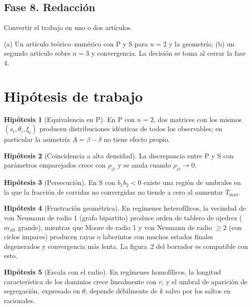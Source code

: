 \documentclass[11pt,a4paper]{article}
\theoremstyle{plain}
\theoremstyle{definition}
\newtheorem{hipotesis}{Hipótesis}
\theoremstyle{remark}
\newcommand{\vac}{\varnothing}
\newcommand{\modP}{\textsf{P}}
\newcommand{\modS}{\textsf{S}}
\newenvironment{fase}[1]{\subsection*{#1}\begin{description}[leftmargin=0pt,itemsep=2pt]}{\end{description}}
\begin{document}
\begin{fase}{Fase 8. Redacción}
\item[Objetivo.] Convertir el trabajo en uno o dos artículos.
\item[Opciones.] (a) Un artículo teórico--numérico con \modP{} y \modS{} para
$n=2$ y la geometría; (b) un segundo artículo sobre $n=3$ y convergencia. La
decisión se toma al cerrar la fase 4.
\end{fase}

\section{Hipótesis de trabajo}

\begin{hipotesis}[Equivalencia en \modP]
En \modP{} con $n=2$, dos matrices con los mismos $(s_i,\theta_i,\xi_i)$
producen distribuciones idénticas de todos los observables; en particular la
asimetría $A=\beta-\delta$ no tiene efecto propio.
\end{hipotesis}

\begin{hipotesis}[Coincidencia a alta densidad]\label{hip:densidad}
La discrepancia entre \modP{} y \modS{} con parámetros emparejados crece con
$\rho_\vac$ y se anula cuando $\rho_\vac\to0$.
\end{hipotesis}

\begin{hipotesis}[Persecución]
En \modS{} con $b_1b_2<0$ existe una región de umbrales en la que la fracción
de corridas no convergidas no tiende a cero al aumentar $T_{\max}$.
\end{hipotesis}

\begin{hipotesis}[Frustración geométrica]\label{hip:frustracion}
En regímenes heterofílicos, la vecindad de von Neumann de radio 1 (grafo
bipartito) produce orden de tablero de ajedrez ($m_{\mathrm{alt}}$ grande),
mientras que Moore de radio 1 y von Neumann de radio $\ge2$ (con ciclos
impares) producen rayas o laberintos con muchos estados finales degenerados y
convergencia más lenta. La figura~2 del borrador es compatible con esto.
\end{hipotesis}

\begin{hipotesis}[Escala con el radio]\label{hip:escala}
En regímenes homofílicos, la longitud característica de los dominios crece
linealmente con $r$, y el umbral de aparición de segregación, expresado en
$\theta$, depende débilmente de $k$ salvo por los saltos en racionales.
\end{hipotesis}
\end{document}
